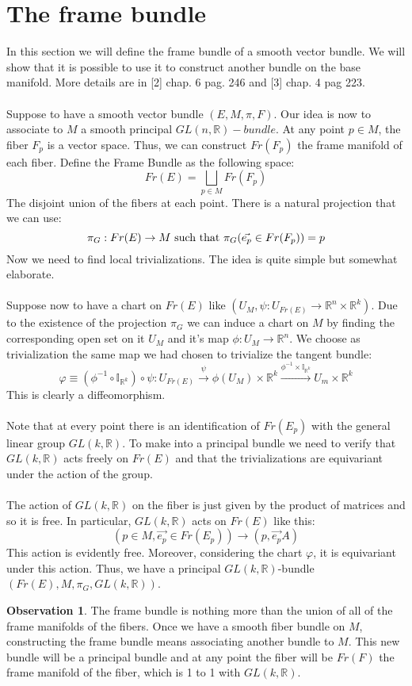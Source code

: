 \documentclass[12pt,a4paper]{report}
\theoremstyle{definition}
\theoremstyle{Theorem}
\theoremstyle{definition}
\theoremstyle{definition}
\newtheorem{Obs}[Def]{Observation}
\begin{document}
	\section{The frame bundle}
	In this section we will define the frame bundle of a smooth vector bundle. We will show that it is possible to use it to construct another bundle on the base manifold. More details are in [2] chap. 6 pag. 246 and [3] chap. 4 pag 223.\\
	\\
	Suppose to have a smooth vector bundle $(E,M,\pi,F)$. Our idea is now to associate to $M$ a smooth principal $GL(n,\mathbb{R})-bundle$. At any point $p\in M$, the fiber $F_p$ is a vector space. Thus, we can construct $Fr(F_p)$ the frame manifold of each fiber. Define the Frame Bundle as the following space:
	$$Fr(E)=\bigsqcup_{p\in M}Fr(F_p)$$
	The disjoint union of the fibers at each point. There is a natural projection that we can use:
	$$\pi_G:Fr(E)\rightarrow M\hbox{ such that } \pi_G(\vec{e_p}\in Fr(F_p))=p$$
	Now we need to find local trivializations. The idea is quite simple but somewhat elaborate.\\
	\\
	Suppose now to have a chart on $Fr(E)$ like $(U_{M},\psi:U_{Fr(E)}\rightarrow \mathbb{R}^n\times\mathbb{R}^k)$. Due to the existence of the projection $\pi_G$ we can induce a chart on $M$ by finding the corresponding open set on it $U_M$ and it's map $\phi:U_M\rightarrow \mathbb{R}^n$. We choose as trivialization the same map we had chosen to trivialize the tangent bundle:
	$$\varphi\equiv(\phi^{-1}\circ \mathbb{I}_{\mathbb{R}^k})\circ \psi: U_{Fr(E)}\xrightarrow{\psi}\phi(U_M)\times\mathbb{R}^k\xrightarrow{\phi^{-1}\times\mathbb{I}_{\mathbb{R}^k}}U_m\times\mathbb{R}^k$$
	This is clearly a diffeomorphism.\\
	\\
	Note that at every point there is an identification of $Fr(E_p)$ with the general linear group $GL(k,\mathbb{R})$. To make into a principal bundle we need to verify that $GL(k,\mathbb{R})$ acts freely on $Fr(E)$ and that the trivializations are equivariant under the action of the group.\\
	\\
	The action of $GL(k,\mathbb{R})$ on the fiber is just given by the product of matrices and so it is free. In particular, $GL(k,\mathbb{R})$ acts on $Fr(E)$ like this:
	$$(p\in M,\vec{e_p}\in Fr(E_p))\longrightarrow(p,\vec{e_p}A)$$
	This action is evidently free. Moreover, considering the chart $\varphi$, it is equivariant under this action. Thus, we have a principal $GL(k,\mathbb{R})$-bundle $(Fr(E),M,\pi_G,GL(k,\mathbb{R}))$.
	\begin{Obs}
		The frame bundle is nothing more than the union of all of the frame manifolds of the fibers. Once we have a smooth fiber bundle on $M$, constructing the frame bundle means associating another bundle to $M$. This new bundle will be a principal bundle and at any point the fiber will be $Fr(F)$ the frame manifold of the fiber, which is 1 to 1 with $GL(k,\mathbb{R})$.
	\end{Obs}
\end{document}
